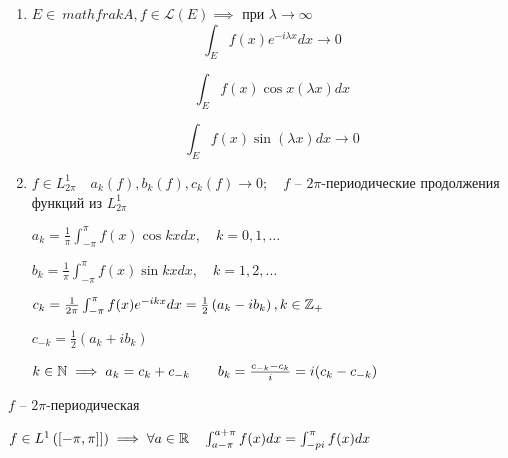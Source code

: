 \begin{theorem}

\begin{enumerate}
    \item $E \in \ mathfrak{A} , f \in \mathcal L (E) \implies $
  при  $\lambda \to \infty $
    \[ \int_E f(x) e ^{-i\lambda x} dx \to 0 \]

    \[\int_E f(x)\cos x(\lambda x)dx\]

    \[\int_E f(x)\sin (\lambda x)dx \to 0\]
    \item $f\in L^1_{2\pi}\quad a_k(f), b_k(f), c_k(f) \to 0;\quad f$ -- $2\pi$-периодические продолжения функций из $L^1_{2\pi}$

    $a_k = \frac{1}{\pi} \int_{-\pi}^{\pi}f(x)\cos kx dx, \quad k = 0,1,\ldots$

    $b_k = \frac{1}{\pi}\int_{-\pi}^{\pi} f(x) \sin kxdx, \quad k = 1, 2, \ldots$

    $c_k = \frac{1}{2\pi} \int_{-\pi}^{\pi}f(x)e^{-ikx}dx = \frac{1}{2}\left( a_k - ib_k \right), k\in \mathbb{Z}_+ $

    $c_{-k} = \frac{1}{2}\left( a_k + i b_k \right) $

    $k\in \mathbb{N}  \implies a_k = c_k + c_{-k}\qquad b_k = \frac{c_{-k} - c_k}{i} = i(c_k - c_{-k})$
\end{enumerate}
\end{theorem}

\begin{note}
    $f$ -- $2\pi$-периодическая

    $f\in L^1\left( \left[ -\pi, \pi \right] ] \right) \implies \forall a\in \mathbb{R}\quad \int_{a - \pi}^{a + \pi}f(x)dx = \int_{-pi}^{\pi}f(x)dx $
\end{note}

